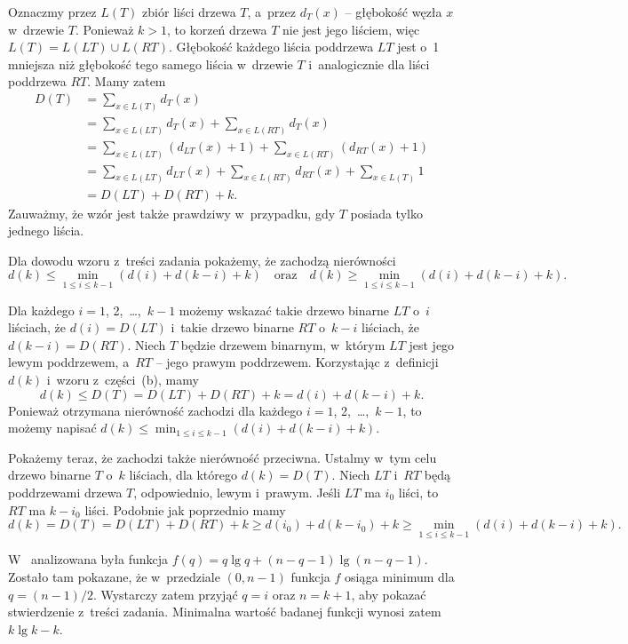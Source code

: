 \subproblem %
Oznaczmy przez $L(T)$ zbiór liści drzewa $T$, a~przez $d_T(x)$ -- głębokość węzła $x$ w~drzewie $T$. Ponieważ $k>1$, to korzeń drzewa $T$ nie jest jego liściem, więc $L(T)=L(LT)\cup L(RT)$. Głębokość każdego liścia poddrzewa $LT$ jest o~1 mniejsza niż głębokość tego samego liścia w~drzewie $T$ i~analogicznie dla liści poddrzewa $RT$. Mamy zatem
\begin{align*}
    D(T) &= \sum_{x\in L(T)}d_T(x) \\
	&= \sum_{x\in L(LT)}d_T(x)+\sum_{x\in L(RT)}d_T(x) \\
	&= \sum_{x\in L(LT)}(d_{LT}(x)+1)+\sum_{x\in L(RT)}(d_{RT}(x)+1) \\
	&= \sum_{x\in L(LT)}d_{LT}(x)+\sum_{x\in L(RT)}d_{RT}(x)+\sum_{x\in L(T)}1 \\[1mm]
	&= D(LT)+D(RT)+k.
\end{align*}
Zauważmy, że wzór jest także prawdziwy w~przypadku, gdy $T$ posiada tylko jednego liścia.

\subproblem %

\noindent Dla dowodu wzoru z~treści zadania pokażemy, że zachodzą nierówności
\[
    d(k) \le \min_{1\le i\le k-1}(d(i)+d(k-i)+k) \quad\text{oraz}\quad d(k) \ge \min_{1\le i\le k-1}(d(i)+d(k-i)+k).
\]

Dla każdego $i=1$, 2,~\dots,~$k-1$ możemy wskazać takie drzewo binarne $LT$ o~$i$ liściach, że $d(i)=D(LT)$ i~takie drzewo binarne $RT$ o~$k-i$ liściach, że $d(k-i)=D(RT)$. Niech $T$ będzie drzewem binarnym, w~którym $LT$ jest jego lewym poddrzewem, a~$RT$ -- jego prawym poddrzewem. Korzystając z~definicji $d(k)$ i~wzoru z~części~(b), mamy
\[
    d(k) \le D(T) = D(LT)+D(RT)+k = d(i)+d(k-i)+k.
\]
Ponieważ otrzymana nierówność zachodzi dla każdego $i=1$, 2,~\dots,~$k-1$, to możemy napisać $d(k)\le\min_{1\le i\le k-1}(d(i)+d(k-i)+k)$.

Pokażemy teraz, że zachodzi także nierówność przeciwna. Ustalmy w~tym celu drzewo binarne $T$ o~$k$ liściach, dla którego $d(k)=D(T)$. Niech $LT$ i~$RT$ będą poddrzewami drzewa $T$, odpowiednio, lewym i~prawym. Jeśli $LT$ ma $i_0$ liści, to $RT$ ma $k-i_0$ liści. Podobnie jak poprzednio mamy
\[
    d(k) = D(T) = D(LT)+D(RT)+k \ge d(i_0)+d(k-i_0)+k \ge \min_{1\le i\le k-1}(d(i)+d(k-i)+k).
\]

\subproblem %
W~ analizowana była funkcja $f(q)=q\lg q+(n-q-1)\lg(n-q-1)$. Zostało tam pokazane, że w~przedziale $(0,n-1)$ funkcja $f$ osiąga minimum dla $q=(n-1)/2$. Wystarczy zatem przyjąć $q=i$ oraz $n=k+1$, aby pokazać stwierdzenie z~treści zadania. Minimalna wartość badanej funkcji wynosi zatem $k\lg k-k$.

